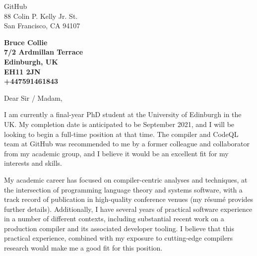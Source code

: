 \documentclass[11pt]{letter} %
\begin{document}

\begin{letter}{GitHub\\
88 Colin P. Kelly Jr. St.\\
San Francisco, CA 94107} 


\begin{center}
\large\bf Bruce Collie \\ %
7/2 Ardmillan Terrace\\ Edinburgh, UK \\ EH11 2JN \\ +447591461843
\end{center} 
\vfill

\signature{Bruce Collie} %


\opening{Dear Sir / Madam,} 

I am currently a final-year PhD student at the University of Edinburgh in the
UK. My completion date is anticipated to be September 2021, and I will be
looking to begin a full-time position at that time. The compiler and CodeQL team
at GitHub was recommended to me by a former colleague and collaborator from my
academic group, and I believe it would be an excellent fit for my interests and
skills.

My academic career has focused on compiler-centric analyses and techniques,
at the intersection of programming language theory and systems software, with a
track record of publication in high-quality conference venues (my r\'esum\'e
provides further details). Additionally, I have several years of practical
software experience in a number of different contexts, including substantial
recent work on a production compiler and its associated developer tooling. I
believe that this practical experience, combined with my exposure to
cutting-edge compilers research would make me a good fit for this position.


\end{letter}
\end{document}
